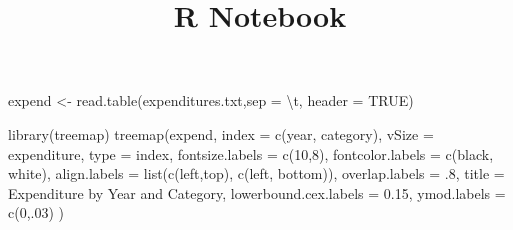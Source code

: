 \documentclass[]{article}
\title{R Notebook}
\author{}
\date{}
\newenvironment{Shaded}{\begin{snugshade}}{\end{snugshade}}
\newcommand{\AttributeTok}[1]{\textcolor[rgb]{0.77,0.63,0.00}{#1}}
\newcommand{\ConstantTok}[1]{\textcolor[rgb]{0.00,0.00,0.00}{#1}}
\newcommand{\DecValTok}[1]{\textcolor[rgb]{0.00,0.00,0.81}{#1}}
\newcommand{\FloatTok}[1]{\textcolor[rgb]{0.00,0.00,0.81}{#1}}
\newcommand{\FunctionTok}[1]{\textcolor[rgb]{0.00,0.00,0.00}{#1}}
\newcommand{\NormalTok}[1]{#1}
\newcommand{\OtherTok}[1]{\textcolor[rgb]{0.56,0.35,0.01}{#1}}
\newcommand{\SpecialCharTok}[1]{\textcolor[rgb]{0.00,0.00,0.00}{#1}}
\newcommand{\StringTok}[1]{\textcolor[rgb]{0.31,0.60,0.02}{#1}}
\begin{document}
\maketitle

\begin{Shaded}
\begin{Highlighting}[]
\NormalTok{expend }\OtherTok{\textless{}{-}} \FunctionTok{read.table}\NormalTok{(}\StringTok{\textquotesingle{}expenditures.txt\textquotesingle{}}\NormalTok{,}\AttributeTok{sep =} \StringTok{\textquotesingle{}}\SpecialCharTok{\textbackslash{}t}\StringTok{\textquotesingle{}}\NormalTok{, }\AttributeTok{header =} \ConstantTok{TRUE}\NormalTok{)}
\end{Highlighting}
\end{Shaded}

\begin{Shaded}
\begin{Highlighting}[]
\FunctionTok{library}\NormalTok{(treemap)}
\FunctionTok{treemap}\NormalTok{(expend,}
        \AttributeTok{index =} \FunctionTok{c}\NormalTok{(}\StringTok{\textquotesingle{}year\textquotesingle{}}\NormalTok{, }\StringTok{\textquotesingle{}category\textquotesingle{}}\NormalTok{),}
        \AttributeTok{vSize =} \StringTok{\textquotesingle{}expenditure\textquotesingle{}}\NormalTok{,}
        \AttributeTok{type =} \StringTok{\textquotesingle{}index\textquotesingle{}}\NormalTok{,}
        \AttributeTok{fontsize.labels =} \FunctionTok{c}\NormalTok{(}\DecValTok{10}\NormalTok{,}\DecValTok{8}\NormalTok{),}
        \AttributeTok{fontcolor.labels =} \FunctionTok{c}\NormalTok{(}\StringTok{\textquotesingle{}black\textquotesingle{}}\NormalTok{, }\StringTok{\textquotesingle{}white\textquotesingle{}}\NormalTok{),}
        \AttributeTok{align.labels =} \FunctionTok{list}\NormalTok{(}\FunctionTok{c}\NormalTok{(}\StringTok{\textquotesingle{}left\textquotesingle{}}\NormalTok{,}\StringTok{\textquotesingle{}top\textquotesingle{}}\NormalTok{),}
                            \FunctionTok{c}\NormalTok{(}\StringTok{\textquotesingle{}left\textquotesingle{}}\NormalTok{, }\StringTok{\textquotesingle{}bottom\textquotesingle{}}\NormalTok{)),}
        \AttributeTok{overlap.labels =}\NormalTok{ .}\DecValTok{8}\NormalTok{,}
        \AttributeTok{title =} \StringTok{\textquotesingle{}Expenditure by Year and Category\textquotesingle{}}\NormalTok{,}
        \AttributeTok{lowerbound.cex.labels =} \FloatTok{0.15}\NormalTok{,}
        \AttributeTok{ymod.labels =} \FunctionTok{c}\NormalTok{(}\DecValTok{0}\NormalTok{,.}\DecValTok{03}\NormalTok{)}
\NormalTok{        )}
\end{Highlighting}
\end{Shaded}
\end{document}
